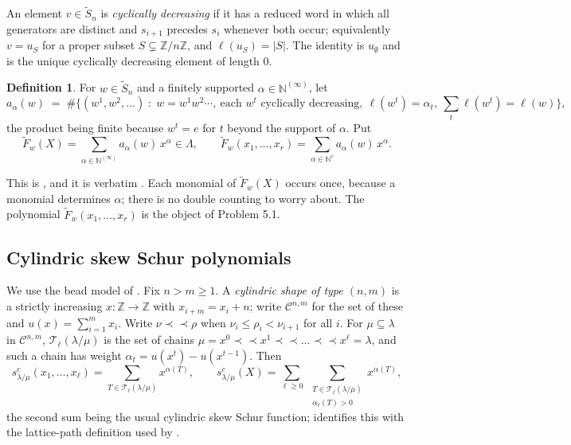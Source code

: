 \documentclass[11pt]{article}
\theoremstyle{plain}
\theoremstyle{definition}
\newtheorem{defn}[thm]{Definition}
\newcommand{\Z}{\mathbb{Z}}
\newcommand{\N}{\mathbb{N}}
\newcommand{\Saff}{\widetilde{S}_{n}}
\newcommand{\Fw}{\widetilde{F}_{w}}
\newcommand{\cyl}{\mathcal{C}}
\newcommand{\hstrip}{\prec\!\!\prec}
\begin{document}
An element $v\in\Saff$ is \emph{cyclically decreasing} if it has a reduced word in which all
generators are distinct and $s_{i+1}$ precedes $s_i$ whenever both occur; equivalently
$v=u_S$ for a proper subset $S\subsetneq\Z/n\Z$, and $\ell(u_S)=|S|$. The identity is $u_\emptyset$
and is the unique cyclically decreasing element of length $0$.

\begin{defn}\label{def:astan}
For $w\in\Saff$ and a finitely supported $\alpha\in\N^{(\infty)}$, let
\[
  a_\alpha(w)\;=\;\#\bigl\{(w^1,w^2,\dots)\;:\;w=w^1w^2\cdots,\ \text{each }w^t
  \text{ cyclically decreasing},\ \ell(w^t)=\alpha_t,\ \textstyle\sum_t\ell(w^t)=\ell(w)\bigr\},
\]
the product being finite because $w^t=e$ for $t$ beyond the support of $\alpha$. Put
\[
  \Fw(X)=\sum_{\alpha\in\N^{(\infty)}}a_\alpha(w)\,x^\alpha\in\Lambda,
  \qquad
  \Fw(x_1,\dots,x_r)=\sum_{\alpha\in\N^{r}}a_\alpha(w)\,x^\alpha .
\]
\end{defn}

This is \cite[Alternative Definition 2, l.853--861]{Lam2006}, and it is verbatim
\cite[(\texttt{def-affine-stanley})]{WZZ}. Each monomial of $\Fw(X)$ occurs once, because a
monomial determines $\alpha$; there is no double counting to worry about. The polynomial
$\Fw(x_1,\dots,x_r)$ is the object of Problem 5.1.

\subsection{Cylindric skew Schur polynomials}

We use the bead model of \cite[\S2]{Clio2026}. Fix $n>m\ge1$. A \emph{cylindric shape of type
$(n,m)$} is a strictly increasing $x:\Z\to\Z$ with $x_{i+m}=x_i+n$; write $\cyl^{n,m}$ for the
set of these and $u(x)=\sum_{i=1}^m x_i$. Write $\nu\hstrip\rho$ when
$\nu_i\le\rho_i<\nu_{i+1}$ for all $i$. For $\mu\subseteq\lambda$ in $\cyl^{n,m}$,
$\mathcal T_\ell(\lambda/\mu)$ is the set of chains
$\mu=x^0\hstrip x^1\hstrip\dots\hstrip x^\ell=\lambda$, and such a chain has weight
$\alpha_t=u(x^t)-u(x^{t-1})$. Then
\[
  s^{c}_{\lambda/\mu}(x_1,\dots,x_\ell)=\sum_{T\in\mathcal T_\ell(\lambda/\mu)}x^{\alpha(T)},
  \qquad
  s^{c}_{\lambda/\mu}(X)=\sum_{\ell\ge0}\ \sum_{\substack{T\in\mathcal T_\ell(\lambda/\mu)\\ \alpha_\ell(T)>0}}x^{\alpha(T)} ,
\]
the second sum being the usual cylindric skew Schur function; \cite[Prop.~2.2]{Clio2026}
identifies this with the lattice-path definition used by \cite{WZZ}.
\end{document}
